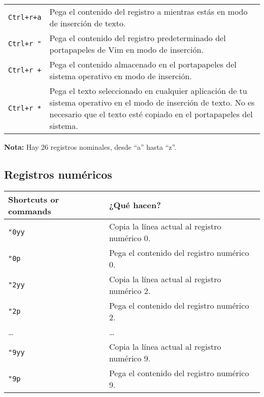 \documentclass[
  doc,
  floatsintext,
  longtable,
  a4paper,
  nolmodern,
  notxfonts,
  notimes,
  colorlinks=true,linkcolor=blue,citecolor=blue,urlcolor=blue]{apa7}
\begin{document}
\begin{longtable}[]{@{}
  >{\raggedright\arraybackslash}p{}
  >{\raggedright\arraybackslash}p{}@{}}
\texttt{Ctrl+r+a} & Pega el contenido del registro a mientras estás en
modo de inserción de texto. \\
\texttt{Ctrl+r\ "} & Pega el contenido del registro predeterminado del
portapapeles de Vim en modo de inserción. \\
\texttt{Ctrl+r\ +} & Pega el contenido almacenado en el portapapeles del
sistema operativo en modo de inserción. \\
\texttt{Ctrl+r\ *} & Pega el texto seleccionado en cualquier aplicación
de tu sistema operativo en el modo de inserción de texto. No es
necesario que el texto esté copiado en el portapapeles del sistema. \\
\end{longtable}

\textbf{Nota:} Hay 26 registros nominales, desde ``a'' hasta ``z''.

\subsection{Registros numéricos}\label{registros-numuxe9ricos}

\begin{longtable}[]{@{}
  >{\raggedright\arraybackslash}p{}
  >{\raggedright\arraybackslash}p{}@{}}
\toprule\noalign{}
\begin{minipage}[b]{\linewidth}\raggedright
Shortcuts or commands
\end{minipage} & \begin{minipage}[b]{\linewidth}\raggedright
¿Qué hacen?
\end{minipage} \\
\midrule\noalign{}
\endhead
\bottomrule\noalign{}
\endlastfoot
\texttt{"0yy} & Copia la línea actual al registro numérico 0. \\
\texttt{"0p} & Pega el contenido del registro numérico 0. \\
\texttt{"2yy} & Copia la línea actual al registro numérico 2. \\
\texttt{"2p} & Pega el contenido del registro numérico 2. \\
\ldots{} & \ldots{} \\
\texttt{"9yy} & Copia la línea actual al registro numérico 9. \\
\texttt{"9p} & Pega el contenido del registro numérico 9. \\
\end{longtable}
\end{document}
